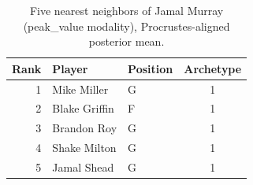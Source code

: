 \begin{table}[htbp]
  \centering\small
  \begin{tabular}{rllc}
    \toprule
    Rank & Player & Position & Archetype \\
    \midrule
    1 & Mike Miller & G & 1 \\
    2 & Blake Griffin & F & 1 \\
    3 & Brandon Roy & G & 1 \\
    4 & Shake Milton & G & 1 \\
    5 & Jamal Shead & G & 1 \\
    \bottomrule
  \end{tabular}
  \caption{Five nearest neighbors of Jamal Murray (peak_value modality), Procrustes-aligned posterior mean.}
  \label{tab:Jamal_Murray_neighbors_peak_value}
\end{table}

